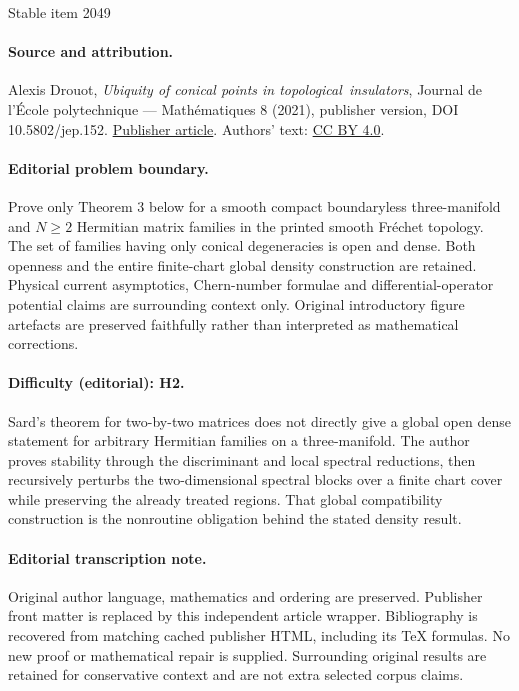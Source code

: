 \documentclass[11pt]{article}
\numberwithin{equation}{section}
\begin{document}
\begin{center}{\Large Stable item 2049}\end{center}
\paragraph{Source and attribution.}
Alexis Drouot, \emph{Ubiquity of conical points in topological insulators}, Journal de l’École polytechnique — Mathématiques 8 (2021), publisher version, DOI 10.5802/jep.152. \href{https://jep.centre-mersenne.org/articles/10.5802/jep.152/}{Publisher article}. Authors' text: \href{https://creativecommons.org/licenses/by/4.0/}{CC BY 4.0}.
\paragraph{Editorial problem boundary.}
Prove only Theorem 3 below for a smooth compact boundaryless three-manifold and \(N\ge2\) Hermitian matrix families in the printed smooth Fréchet topology. The set of families having only conical degeneracies is open and dense. Both openness and the entire finite-chart global density construction are retained. Physical current asymptotics, Chern-number formulae and differential-operator potential claims are surrounding context only. Original introductory figure artefacts are preserved faithfully rather than interpreted as mathematical corrections.
\paragraph{Difficulty (editorial): H2.}
Sard's theorem for two-by-two matrices does not directly give a global open dense statement for arbitrary Hermitian families on a three-manifold. The author proves stability through the discriminant and local spectral reductions, then recursively perturbs the two-dimensional spectral blocks over a finite chart cover while preserving the already treated regions. That global compatibility construction is the nonroutine obligation behind the stated density result.
\paragraph{Editorial transcription note.}
Original author language, mathematics and ordering are preserved. Publisher front matter is replaced by this independent article wrapper. Bibliography is recovered from matching cached publisher HTML, including its TeX formulas. No new proof or mathematical repair is supplied. Surrounding original results are retained for conservative context and are not extra selected corpus claims.
\clearpage

\clearpage
\end{document}
